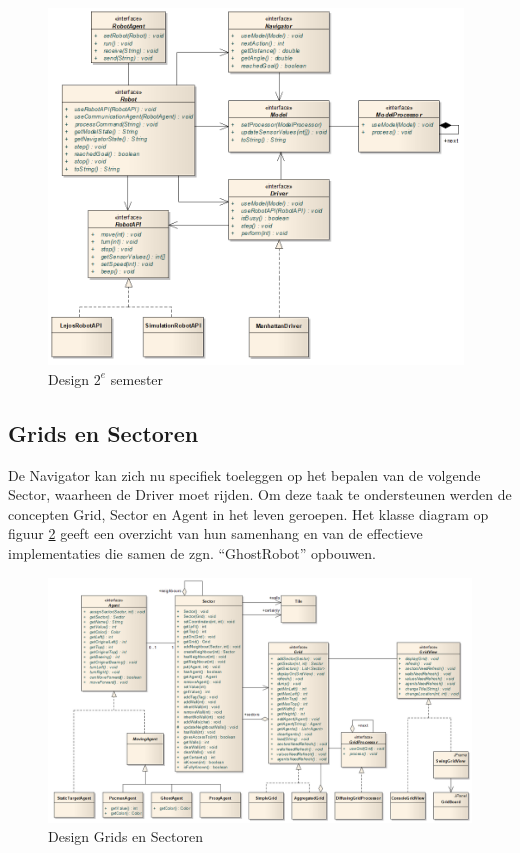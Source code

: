 \documentclass[12pt,a4paper]{report}
\begin{document}
\begin{figure}[htbp]
  \centering
  \includegraphics[width=110mm]{resources/design-semester2.png}
  \caption{Design $2^e$ semester}
  \label{uml:design-semster2}
\end{figure}

\subsection{Grids en Sectoren}

De Navigator kan zich nu specifiek toeleggen op het bepalen van de volgende Sector, waarheen de Driver moet rijden. Om deze taak te ondersteunen werden de concepten Grid, Sector en Agent in het leven geroepen. Het klasse diagram op figuur \ref{uml:grids-sectoren} geeft een overzicht van hun samenhang en van de effectieve implementaties die samen de zgn. ``GhostRobot'' opbouwen.

\begin{figure}[htbp]
  \centering
  \includegraphics[width=200mm, angle=90]{resources/grids-sectors.png}
  \caption{Design Grids en Sectoren}
  \label{uml:grids-sectoren}
\end{figure}
\end{document}
